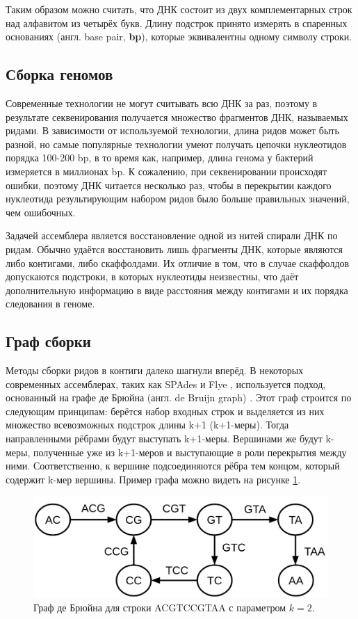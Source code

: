 \documentclass[14pt]{matmex-diploma-custom}
\begin{document}
Таким образом можно считать, что ДНК состоит из двух комплементарных строк над алфавитом из четырёх букв. Длину подстрок принято измерять в спаренных основаниях (англ. base pair, \textbf{bp}), которые эквивалентны одному символу строки.

\subsection{Сборка геномов}
Современные технологии не могут считывать всю ДНК за раз, поэтому в результате секвенирования получается множество фрагментов ДНК, называемых ридами. В зависимости от используемой технологии, длина ридов может быть разной, но самые популярные технологии умеют получать цепочки нуклеотидов порядка 100-200 bp, в то время как, например, длина генома у бактерий измеряется в миллионах bp. К сожалению, при секвенировании происходят ошибки, поэтому ДНК читается несколько раз, чтобы в перекрытии каждого нуклеотида результирующим набором ридов было больше правильных значений, чем ошибочных.

Задачей ассемблера является восстановление одной из нитей спирали ДНК по ридам. Обычно удаётся  восстановить лишь фрагменты ДНК, которые являются либо контигами, либо скаффолдами. Их отличие в том, что в случае скаффолдов допускаются подстроки, в которых нуклеотиды неизвестны, что даёт дополнительную информацию в виде расстояния между контигами и их порядка следования в геноме.

\subsection{Граф сборки}
Методы сборки ридов в контиги далеко шагнули вперёд. В некоторых современных ассемблерах, таких как SPAdes \cite{art:SPAdes} и Flye \cite{art:flye}, используется подход, основанный на графе де Брюйна (англ. de Bruijn graph) \cite{art:Pevzner}. Этот граф строится по следующим принципам: берётся набор входных строк и выделяется из них множество всевозможных подстрок длины k+1 (k+1-меры). Тогда направленными рёбрами будут выступать k+1-меры. Вершинами же будут k-меры, полученные уже из k+1-меров и выступающие в роли перекрытия между ними. Соответственно, к вершине подсоединяются рёбра тем концом, который содержит k-мер вершины. Пример графа можно видеть на рисунке \ref{fig:debruijn}.

\begin{figure}[h]
	\centering
	\includegraphics[scale=0.3]{debruijn.png}
	\caption{Граф де Брюйна для строки ACGTCCGTAA с параметром ${k=2}$.}
	\label{fig:debruijn}
\end{figure}
\end{document}
